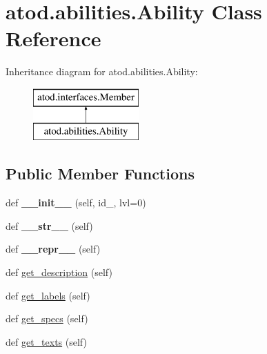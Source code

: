 \hypertarget{classatod_1_1abilities_1_1_ability}{}\section{atod.\+abilities.\+Ability Class Reference}
\label{classatod_1_1abilities_1_1_ability}
Inheritance diagram for atod.\+abilities.\+Ability\+:\begin{figure}[H]
\begin{center}
\leavevmode
\includegraphics[height=2.000000cm]{classatod_1_1abilities_1_1_ability}
\end{center}
\end{figure}
\subsection*{Public Member Functions}
\begin{DoxyCompactItemize}
\item 
def {\bfseries \+\_\+\+\_\+init\+\_\+\+\_\+} (self, id\+\_\+, lvl=0)\hypertarget{classatod_1_1abilities_1_1_ability_a651ed69d665e42eb1bef757b4e524d7f}{}\label{classatod_1_1abilities_1_1_ability_a651ed69d665e42eb1bef757b4e524d7f}

\item 
def {\bfseries \+\_\+\+\_\+str\+\_\+\+\_\+} (self)\hypertarget{classatod_1_1abilities_1_1_ability_ae1af33d0f9e9f1773d7bf8d2e58aba3f}{}\label{classatod_1_1abilities_1_1_ability_ae1af33d0f9e9f1773d7bf8d2e58aba3f}

\item 
def {\bfseries \+\_\+\+\_\+repr\+\_\+\+\_\+} (self)\hypertarget{classatod_1_1abilities_1_1_ability_adbc62b463e3aece03e5ea5148c7866c1}{}\label{classatod_1_1abilities_1_1_ability_adbc62b463e3aece03e5ea5148c7866c1}

\item 
def \hyperlink{classatod_1_1abilities_1_1_ability_a79f3dd1154fb1862d396da4bb47eca85}{get\+\_\+description} (self)
\item 
def \hyperlink{classatod_1_1abilities_1_1_ability_a991ef8299a9817642bf457f7e8dd03b3}{get\+\_\+labels} (self)
\item 
def \hyperlink{classatod_1_1abilities_1_1_ability_af34b6c7240c2311edaffd784fb89cb4f}{get\+\_\+specs} (self)
\item 
def \hyperlink{classatod_1_1abilities_1_1_ability_a8ec6949a32f54ba31021fd710d525045}{get\+\_\+texts} (self)
\end{DoxyCompactItemize}
